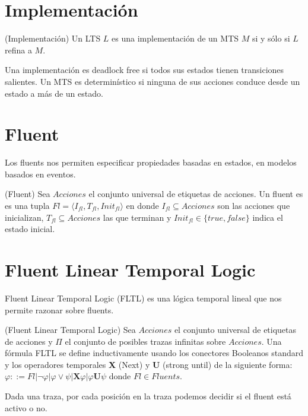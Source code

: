 \section{Implementación}

\begin{definition}{(Implementación)}
Un LTS $L$ es una implementación de un MTS $M$ si y sólo si $L$ refina a $M$.
\end{definition}

Una implementación es deadlock free si todos sus estados tienen transiciones salientes. 
Un MTS es determinístico si ninguna de sus acciones conduce desde un estado a más de un estado.

\section{Fluent}

Los fluents nos permiten especificar propiedades basadas en estados, en modelos basados en eventos.

\begin{definition}{(Fluent)}
Sea $Acciones$ el conjunto universal de etiquetas de acciones. 
Un fluent es es una tupla $Fl = \langle I_{fl}, T_{fl}, Init_{fl} \rangle$ en donde $I_{fl} \subseteq Acciones$ son las acciones 
que inicializan, $T_{fl} \subseteq Acciones$ las que terminan y $Init_{fl} \in \{true, false\}$ indica el estado inicial.
\end{definition}

\section{Fluent Linear Temporal Logic}
Fluent Linear Temporal Logic \cite{FLTL} (FLTL) es una lógica temporal lineal que nos permite razonar sobre fluents.

\begin{definition}{(Fluent Linear Temporal Logic)}
Sea $Acciones$ el conjunto universal de etiquetas de acciones y $\Pi$ el conjunto de posibles trazas infinitas sobre $Acciones$. 
Una fórmula FLTL se define inductivamente usando los conectores Booleanos standard y los operadores temporales \textbf{X} (Next) y 
\textbf{U} (strong until) de la siguiente forma:\\
$\varphi ::= Fl | \neg\varphi | \varphi \lor \psi | \textbf{X}\varphi | \varphi\textbf{U}\psi$ donde $Fl \in Fluents$.
\end{definition}

Dada una traza, por cada posición en la traza podemos decidir si el fluent está activo o no.

